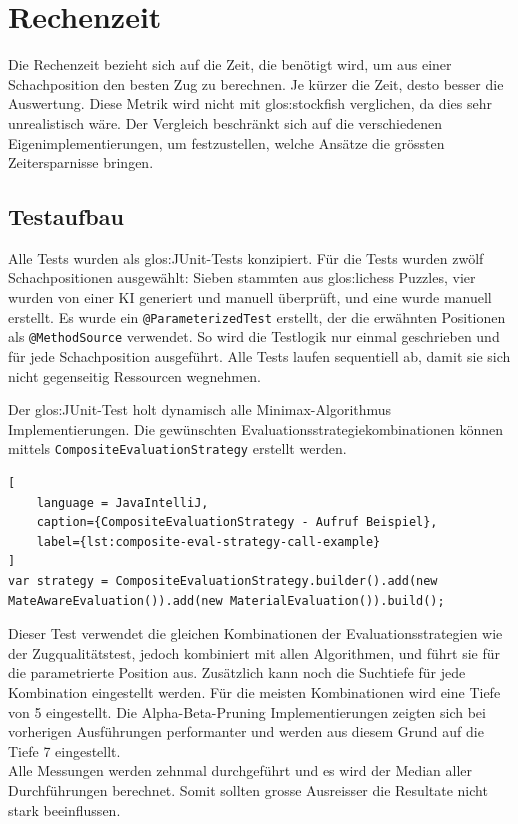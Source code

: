 \section{Rechenzeit}
\label{sec:rechenzeit}
Die Rechenzeit bezieht sich auf die Zeit, die benötigt wird, um aus einer Schachposition den besten Zug zu berechnen.
Je kürzer die Zeit, desto besser die Auswertung.
Diese Metrik wird nicht mit \gls{glos:stockfish} verglichen, da dies sehr unrealistisch wäre.
Der Vergleich beschränkt sich auf die verschiedenen Eigenimplementierungen, um festzustellen, welche Ansätze die grössten Zeitersparnisse bringen.

\subsection{Testaufbau}
Alle Tests wurden als \gls{glos:JUnit}-Tests konzipiert.
Für die Tests wurden zwölf Schachpositionen ausgewählt: Sieben stammten aus \gls{glos:lichess} Puzzles, vier wurden von einer KI generiert und manuell überprüft, und eine wurde manuell erstellt.
Es wurde ein \texttt{@ParameterizedTest} erstellt, der die erwähnten Positionen als \texttt{@MethodSource} verwendet.
So wird die Testlogik nur einmal geschrieben und für jede Schachposition ausgeführt.
Alle Tests laufen sequentiell ab, damit sie sich nicht gegenseitig Ressourcen wegnehmen.

Der \gls{glos:JUnit}-Test holt dynamisch alle Minimax-Algorithmus Implementierungen.
Die gewünschten Evaluationsstrategiekombinationen können mittels \texttt{CompositeEvaluationStrategy} erstellt werden.
\begin{lstlisting}[
    language = JavaIntelliJ,
    caption={CompositeEvaluationStrategy - Aufruf Beispiel},
    label={lst:composite-eval-strategy-call-example}
]
var strategy = CompositeEvaluationStrategy.builder().add(new MateAwareEvaluation()).add(new MaterialEvaluation()).build();
\end{lstlisting}


Dieser Test verwendet die gleichen Kombinationen der Evaluationsstrategien wie der Zugqualitätstest, jedoch kombiniert mit allen Algorithmen, und führt sie für die parametrierte Position aus.
Zusätzlich kann noch die Suchtiefe für jede Kombination eingestellt werden.
Für die meisten Kombinationen wird eine Tiefe von 5 eingestellt.
Die Alpha-Beta-Pruning Implementierungen zeigten sich bei vorherigen Ausführungen performanter und werden aus diesem Grund auf die Tiefe 7 eingestellt. \\
Alle Messungen werden zehnmal durchgeführt und es wird der Median aller Durchführungen berechnet.
Somit sollten grosse Ausreisser die Resultate nicht stark beeinflussen.

